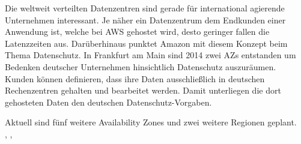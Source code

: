 Die weltweit verteilten Datenzentren sind gerade für international agierende Unternehmen interessant. Je näher ein Datenzentrum dem Endkunden einer Anwendung ist, welche bei AWS gehostet wird, desto geringer fallen die Latenzzeiten aus. Darüberhinaus punktet Amazon mit diesem Konzept beim Thema Datenschutz. In Frankfurt am Main sind 2014 zwei AZs entstanden um Bedenken deutscher Unternehmen hinsichtlich Datenschutz auszuräumen. Kunden können definieren, dass ihre Daten ausschließlich in deutschen Rechenzentren gehalten und bearbeitet werden. Damit unterliegen die dort gehosteten Daten den deutschen Datenschutz-Vorgaben.

Aktuell sind fünf weitere Availability Zones und zwei weitere Regionen geplant.
\\ \cite{computerwoche:reder}, \cite{aws:regions}, \cite{aws:azs}


